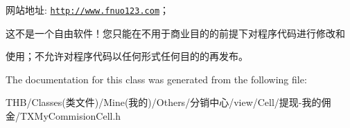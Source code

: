 网站地址\+: \href{http://www.fnuo123.com}{\tt http\+://www.\+fnuo123.\+com}； 



这不是一个自由软件！您只能在不用于商业目的的前提下对程序代码进行修改和

使用；不允许对程序代码以任何形式任何目的的再发布。 

 

The documentation for this class was generated from the following file\+:\begin{DoxyCompactItemize}
\item 
T\+H\+B/\+Classes(类文件)/\+Mine(我的)/\+Others/分销中心/view/\+Cell/提现-\/我的佣金/T\+X\+My\+Commision\+Cell.\+h\end{DoxyCompactItemize}
